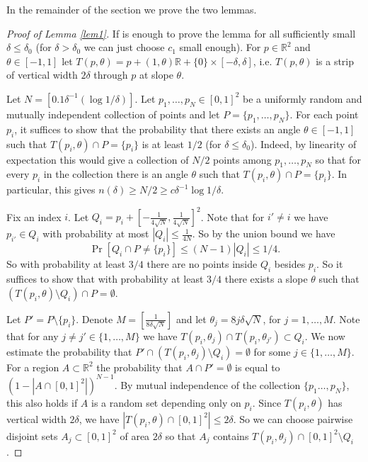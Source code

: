 \documentclass[11pt,letterpaper]{amsart}
\renewcommand{\le}{\leqslant}
\renewcommand{\ge}{\geqslant}
\def\R{\mathbb R}
\def\d{\delta}
\begin{document}
In the remainder of the section we prove the two lemmas.

\begin{proof}[Proof of Lemma \ref{lem1}]
    If is enough to prove the lemma for all sufficiently small $\d \le\d_0$ (for $\d>\d_0$ we can just choose $c_1$ small enough). For $p\in \R^2$ and $\theta \in [-1, 1]$ let $T(p, \theta) = p + (1, \theta)\R + \{0\} \times [-\d, \d]$, i.e. $T(p, \theta)$ is a strip of vertical width $2\d$ through $p$ at slope $\theta$.
    
    Let $N = [0.1 \d^{-1} (\log 1/\d)]$. 
    Let $p_1, \ldots, p_N \in [0,1]^2$ be a uniformly random and mutually independent collection of points and let $P = \{p_1, \ldots, p_N\}$. 
    For each point $p_i$, it suffices to show that the probability that there exists an angle $\theta\in [-1,1]$ such that $T(p_i, \theta) \cap P = \{p_i\}$ is at least $1/2$ (for $\d\le \d_0$). Indeed, by linearity of expectation this would give a collection of $N/2$ points among $p_1, \ldots, p_N$ so that for every $p_i$ in the collection there is an angle $\theta$ such that $T(p_i, \theta)\cap P =\{p_i\}$. In particular, this gives $n(\d) \ge N/2 \ge c \d^{-1}\log 1/\d$.
    
    Fix an index $i$. 
    Let $Q_i = p_i + [- \frac{1}{4\sqrt{N}}, \frac{1}{4\sqrt{N}}]^2$. 
    Note that for $i'\neq i$ we have $p_{i'}\in Q_i$ with probability at most $|Q_i|\le \frac{1}{4N}$. So by the union bound we have
    \begin{equation*}\label{eq:Q}
    \Pr[Q_i \cap P \neq \{p_i\}] \le (N-1) |Q_i| \le 1/4.    
    \end{equation*}
    So with probability at least $3/4$ there are no points inside $Q_i$ besides $p_i$. So it suffices to show that with probability at least $3/4$ there exists a slope $\theta$ such that $(T(p_i, \theta) \setminus Q_i)\cap P = \emptyset$. 

    Let $P' = P\setminus\{p_i\}$.
    Denote $M = [\frac{1}{8\d\sqrt{N}}]$ and let $\theta_j = 8j \d \sqrt{N}$, for $j=1, \ldots, M$. Note that for any $j\neq j' \in \{1, \ldots, M\}$ we have $T(p_i, \theta_j) \cap T(p_i, \theta_{j'})\subset  Q_i$. We now estimate the probability that $P' \cap (T(p_i, \theta_j) \setminus Q_i) = \emptyset$ for some $j \in \{1, \ldots, M\}$. 
    For a region $A \subset \R^2$ the probability that $A\cap P' = \emptyset$ is equal to $(1 - |A \cap [0,1]^2|)^{N-1}$. By mutual independence of the collection $\{p_1 \ldots, p_N\}$, this also holds if $A$ is a random set depending only on $p_i$. Since $T(p_i,\theta)$ has vertical width $2\d$, we have $|T(p_i,\theta) \cap [0,1]^2| \le 2\d$. So we can choose pairwise disjoint sets $A_j\subset [0,1]^2$ of area $2\d$ so that $A_j$ contains $T(p_i, \theta_j) \cap [0,1]^2 \setminus Q_i$.
    

\end{proof}
\end{document}
